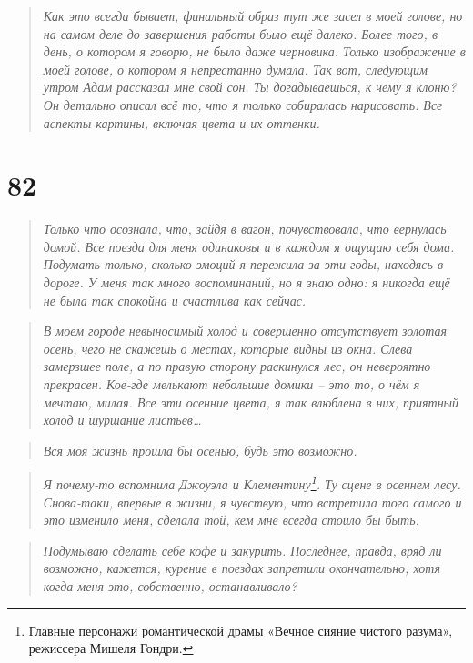 \documentclass[
  a5paperpaper,
  DIV=11,
  numbers=noendperiod]{scrreprt}
\begin{document}
\begin{quote}
\emph{Как это всегда бывает, финальный образ тут же засел в моей голове,
но на самом деле до завершения работы было ещё далеко. Более того, в
день, о котором я говорю, не было даже черновика. Только изображение в
моей голове, о котором я непрестанно думала. Так вот, следующим утром
Адам рассказал мне свой сон. Ты догадываешься, к чему я клоню? Он
детально описал всё то, что я только собиралась нарисовать. Все аспекты
картины, включая цвета и их оттенки.}
\end{quote}

\section*{82}\label{82}


\begin{quote}
\emph{Только что осознала, что, зайдя в вагон, почувствовала, что
вернулась домой. Все поезда для меня одинаковы и в каждом я ощущаю себя
дома. Подумать только, сколько эмоций я пережила за эти годы, находясь в
дороге. У меня так много воспоминаний, но я знаю одно: я никогда ещё не
была так спокойна и счастлива как сейчас.}
\end{quote}

\begin{quote}
\emph{В моем городе невыносимый холод и совершенно отсутствует золотая
осень, чего не скажешь о местах, которые видны из окна. Слева замерзшее
поле, а по правую сторону раскинулся лес, он невероятно прекрасен.
Кое-где мелькают небольшие домики -- это то, о чём я мечтаю, милая. Все
эти осенние цвета, я так влюблена в них, приятный холод и шуршание
листьев\ldots{} }
\end{quote}

\begin{quote}
\emph{Вся моя жизнь прошла бы осенью, будь это возможно.}
\end{quote}

\begin{quote}
\emph{Я почему-то вспомнила Джоуэла и Клементину\footnote{Главные
  персонажи романтической драмы «Вечное сияние чистого разума»,
  режиссера Мишеля Гондри.}. Ту сцене в осеннем лесу. Снова-таки,
впервые в жизни, я чувствую, что встретила того самого и это изменило
меня, сделала той, кем мне всегда стоило бы быть. }
\end{quote}

\begin{quote}
\emph{Подумываю сделать себе кофе и закурить. Последнее, правда, вряд ли
возможно, кажется, курение в поездах запретили окончательно, хотя когда
меня это, собственно, останавливало?}
\end{quote}
\end{document}
